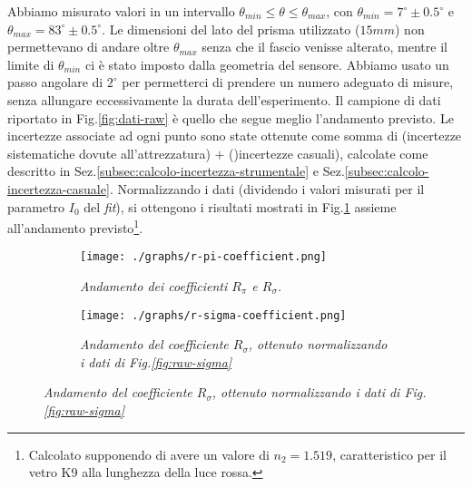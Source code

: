   Abbiamo misurato valori in un intervallo ${\theta_{min} \leq \theta \leq \theta_{max}}$,
  con ${\theta_{min} = 7^\circ \pm 0.5^\circ}$ e $\theta_{max} = 83^\circ \pm 0.5^\circ$.
  Le dimensioni del lato del prisma utilizzato ($15mm$) non permettevano
  di andare oltre $\theta_{max}$ senza che il fascio venisse alterato, mentre il
  limite di $\theta_{min}$ ci è stato imposto dalla geometria del sensore.
  Abbiamo usato un passo angolare di $2^\circ$ per permetterci di prendere un
  numero adeguato di misure, senza allungare eccessivamente la durata dell'esperimento.
  Il campione di dati riportato in Fig.\ref{fig:dati-raw} è quello che segue meglio
  l'andamento previsto.
  Le incertezze associate ad ogni punto sono state ottenute come somma di
  (incertezze sistematiche dovute all'attrezzatura) $+$ ()incertezze casuali), calcolate come
  descritto in Sez.\ref{subsec:calcolo-incertezza-strumentale} e Sez.\ref{subsec:calcolo-incertezza-casuale}.
  Normalizzando i dati (dividendo i valori misurati per il parametro $I_0$ del \emph{fit}), si ottengono i risultati mostrati in Fig.\ref{fig:normalised-coefficients}
  assieme all'andamento previsto\footnote{Calcolato supponendo di avere un valore di $n_2 = 1.519$, %
  caratteristico per il vetro K9 alla lunghezza della luce rossa.}.
  \begin{figure}[H]
    \centering
    \begin{subfigure}[t]{.4\textwidth}
      \texttt{[image: ./graphs/r-pi-coefficient.png]}
      \caption{
        \emph{
          Andamento del coefficiente $R_\pi$, ottenuto normalizzando i dati
          di Fig.\ref{fig:raw-pi}
        }
      }
      \caption{\emph{Andamento dei coefficienti $R_\pi$ e $R_\sigma$.}}
      \label{fig:normalised-coefficients}
    \end{subfigure}%
    \hspace{20mm}
    \begin{subfigure}[t]{.4\textwidth}
      \texttt{[image: ./graphs/r-sigma-coefficient.png]}
      \caption{
        \emph{
          Andamento del coefficiente $R_\sigma$, ottenuto normalizzando i dati
          di Fig.\ref{fig:raw-sigma}
        }
      }
      \label{fig:coefficienti-ampiezza}
    \end{subfigure}
  \end{figure}
%
